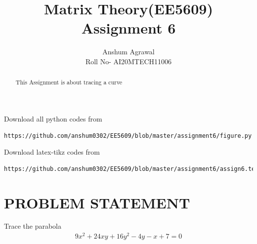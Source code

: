 \documentclass[journal,12pt,twocolumn]{IEEEtran}
\begin{document}
\makeatother
\let\StandardTheFigure\thefigure
\let\vec\mathbf
\renewcommand{\thefigure}{\theproblem}
\def\putbox#1#2#3{\makebox[0in][l]{\makebox[#1][l]{}\raisebox{\baselineskip}[0in][0in]{\raisebox{#2}[0in][0in]{#3}}}}
     \def\rightbox#1{\makebox[0in][r]{#1}}
     \def\centbox#1{\makebox[0in]{#1}}
     \def\topbox#1{\raisebox{-\baselineskip}[0in][0in]{#1}}
     \def\midbox#1{\raisebox{-0.5\baselineskip}[0in][0in]{#1}}
\vspace{3cm}
\title{Matrix Theory(EE5609) Assignment 6}
\author{Anshum Agrawal \\ Roll No- AI20MTECH11006}
%
\maketitle
\newpage
\bigskip
\renewcommand{\thefigure}{\theenumi}
\renewcommand{\thetable}{\theenumi}
\begin{abstract}
  This Assignment is about tracing a curve 
\end{abstract}
Download all python codes from
%                           
\begin{lstlisting}
https://github.com/anshum0302/EE5609/blob/master/assignment6/figure.py
\end{lstlisting}
%
Download latex-tikz codes from 
%
\begin{lstlisting}
https://github.com/anshum0302/EE5609/blob/master/assignment6/assign6.tex
\end{lstlisting}
%
\section{\textbf{PROBLEM STATEMENT}}
Trace the parabola
\begin{align}
  9x^2+24xy+16y^2-4y-x+7=0 \label{eq:prob}
\end{align}
\end{document}
